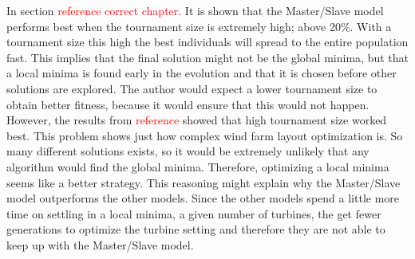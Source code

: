 \noindent In section \textcolor{red}{reference correct chapter}. It is shown that the Master/Slave model performs best when the tournament size is extremely high; above 20\%. With a tournament size this high the best individuals will spread to the entire population fast. This implies that the final solution might not be the global minima, but that a local minima is found early in the evolution and that it is chosen before other solutions are explored. The author would expect a lower tournament size to obtain better fitness, because it would ensure that this would not happen. However, the results from \textcolor{red}{reference} showed that high tournament size worked best. This problem shows just how complex wind farm layout optimization is. So many different solutions exists, so it would be extremely unlikely that any algorithm would find the global minima. Therefore, optimizing a local minima seems like a better strategy. This reasoning might explain why the Master/Slave model outperforms the other models. Since the other models spend a little more time on settling in a local minima, a given number of turbines, the get fewer generations to optimize the turbine setting and therefore they are not able to keep up with the Master/Slave model.


